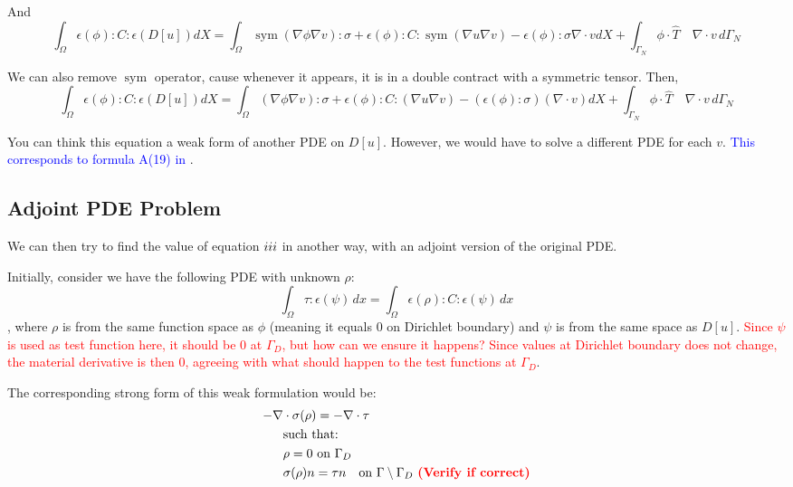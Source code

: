 \documentclass[11pt]{article}
\DeclareMathOperator{\sym}{sym}
\newcommand{\RNum}[1]{\uppercase\expandafter{\romannumeral #1\relax}}
\newcommand{\red}{\textcolor{red}}
\newcommand{\blue}{\textcolor{blue}}
\begin{document}
And
{\small
\begin{equation}
  \int_{\Omega} \epsilon(\phi):C:\epsilon(D[u]) dX =
  \int_{\Omega} \sym(\nabla \phi \nabla v):\sigma + \epsilon(\phi):C:\sym(\nabla u \nabla v) - \epsilon(\phi): \sigma \nabla \cdot v  dX + \int_{\Gamma_{N}} \phi \cdot \hat T \quad \nabla \cdot v\, d\Gamma_{N}
\end{equation}
}

We can also remove $\sym$ operator, cause whenever it appears, it is in a double contract with a symmetric tensor. Then,
{\small
\begin{equation}
  \boxed{\int_{\Omega} \epsilon(\phi):C:\epsilon(D[u]) dX =
  \int_{\Omega} (\nabla \phi \nabla v):\sigma + \epsilon(\phi):C:(\nabla u \nabla v) - (\epsilon(\phi): \sigma) (\nabla \cdot v)  dX + \int_{\Gamma_{N}} \phi \cdot \hat T \quad \nabla \cdot v\, d\Gamma_{N}}
  \label{eq:forwardversion}
\end{equation}
}


You can think this equation a weak form of another PDE on $D[u]$. However, we would have to solve a different PDE for each $v$. \blue{This corresponds to formula A(19) in \cite{panetta2017}}.

\subsection{Adjoint PDE Problem}
We can then try to find the value of equation $\RNum{3}$ in another way, with an adjoint version of the original PDE.

Initially, consider we have the following PDE with unknown $\rho$:
\begin{equation}
  \int_\Omega \tau:\epsilon(\psi)\, dx = \int_\Omega \epsilon(\rho):C:\epsilon(\psi) \, dx 
  \label{eq:adjointproblem}
\end{equation}
, where $\rho$ is from the same function space as $\phi$ (meaning it equals $0$ on Dirichlet boundary) and $\psi$ is from the same space as $D[u]$. \textcolor{red}{Since $\psi$ is used as test function here, it should be $0$ at $\Gamma_D$, but how can we ensure it happens? Since values at Dirichlet boundary does not change, the material derivative is then $0$, agreeing with what should happen to the test functions at $\Gamma_D$}.

The corresponding strong form of this weak formulation would be:
\begin{align*}
  - \nabla & \cdot \sigma(\rho) = - \nabla \cdot \tau \\
  &\text{such that: } \\
  &\rho =  0 \text{ on $\Gamma_D$}\\
  &\sigma(\rho) n = \tau n \quad \text{on $\Gamma \setminus \Gamma_D$  \red{\textbf{(Verify if correct)}}}
\end{align*}
\end{document}
